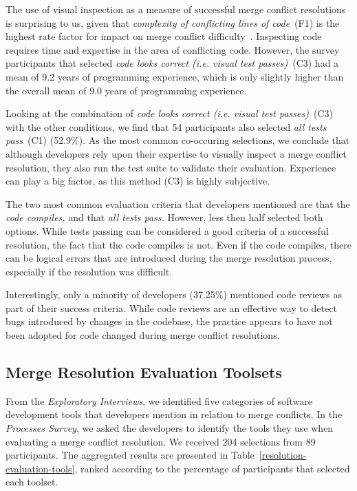 The use of visual inspection as a measure of successful merge conflict resolutions is surprising to us, given that \textit{complexity of conflicting lines of code}~(F1) is the highest rate factor for impact on merge conflict difficulty~\cite{mckee2017software}.
Inspecting code requires time and expertise in the area of conflicting code.
However, the survey participants that selected \textit{code looks correct (i.e. visual test passes)}~(C3) had a mean of 9.2 years of programming experience, which is only slightly higher than the overall mean of 9.0 years of programming experience.

Looking at the combination of \textit{code looks correct (i.e. visual test passes)}~(C3) with the other conditions, we find that 54 participants also selected \textit{all tests pass}~(C1) (52.9\%).
As the most common co-occuring selections, we conclude that although developers rely upon their expertise to visually inspect a merge conflict resolution, they also run the test suite to validate their evaluation.
Experience can play a big factor, as this method (C3) is highly subjective.

The two most common evaluation criteria that developers mentioned are that the \emph{code compiles,} and that \emph{all tests pass.}
However, less then half selected both options.
While tests passing can be considered a good criteria of a successful resolution, the fact that the code compiles is not.
Even if the code compiles, there can be logical errors that are introduced during the merge resolution process, especially if the resolution was difficult.

Interestingly, only a minority of developers (37.25\%) mentioned code reviews as part of their success criteria.
While code reviews are an effective way to detect bugs introduced by changes in the codebase, the practice appears to have not been adopted for code changed during merge conflict resolutions.

\subsection{Merge Resolution Evaluation Toolsets}

From the \textit{Exploratory Interviews}, we identified five categories of software development tools that developers mention in relation to merge conflicts.
In the \textit{Processes Survey}, we asked the developers to identify the tools they use when evaluating a merge conflict resolution.
We received 204 selections from 89 participants.
The aggregated results are presented in Table~\ref{resolution-evaluation-tools}, ranked according to the percentage of participants that selected each toolset.

